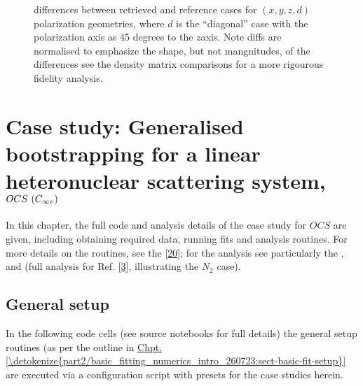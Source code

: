 \documentclass[letterpaper,table,10pt,english]{jupyterBook}
\begin{document}
\begin{figure}[htbp]
\centering
\capstart

\noindent{}
\caption{{\hyperref[\detokenize{backmatter/glossary:term-MF}]{}} differences between retrieved and reference cases for \((x,y,z,d)\) polarization geometries, where \(d\) is the “diagonal” case with the polarization axis as 45 degrees to the \(z\)\sphinxhyphen{}axis. Note diffs are normalised to emphasize the shape, but not mangnitudes, of the differences \sphinxhyphen{} see the density matrix comparisons for a more rigourous fidelity analysis.}\label{\detokenize{part2/case-study-N2_290723:fig-n2-diff}}\end{figure}

\sphinxstepscope


\chapter{Case study: Generalised bootstrapping for a linear heteronuclear scattering system, \protect\(OCS~(C_{\infty v})\protect\)}
\label{\detokenize{part2/case-study-OCS_290723:case-study-generalised-bootstrapping-for-a-linear-heteronuclear-scattering-system-ocs-c-infty-v}}\label{\detokenize{part2/case-study-OCS_290723:chpt-ocs-case-study}}\label{\detokenize{part2/case-study-OCS_290723::doc}}
\sphinxAtStartPar
In this chapter, the full code and analysis details of the case study for \(OCS\) are given, including obtaining required data, running fits and analysis routines. For more details on the routines, see the  {[}\hyperlink{cite.backmatter/bibliography:id680}{20}{]}; for the analysis see particularly the , and  (full analysis for Ref. {[}\hyperlink{cite.backmatter/bibliography:id685}{3}{]}, illustrating the \(N_2\) case).


\section{General setup}
\label{\detokenize{part2/case-study-OCS_290723:general-setup}}
\sphinxAtStartPar
In the following code cells (see source notebooks for full details) the general setup routines (as per the outline in \hyperref[\detokenize{part2/basic_fitting_numerics_intro_260723:sect-basic-fit-setup}]{Chpt.\@ \ref{\detokenize{part2/basic_fitting_numerics_intro_260723:sect-basic-fit-setup}}} are executed via a configuration script with presets for the case studies herein.
\end{document}
